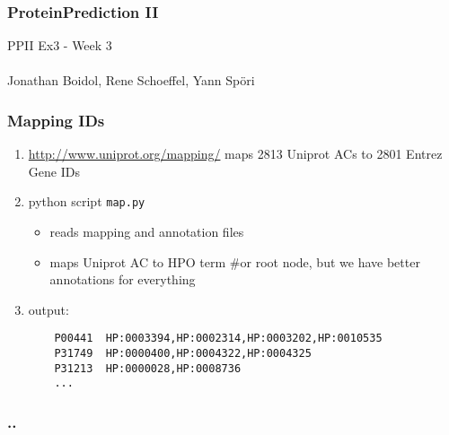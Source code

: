 \documentclass{beamer}
\begin{document}
\begin{frame}
 \frametitle{ProteinPrediction II}
 PPII Ex3 - Week 3\\
 \hfill \\
 Jonathan Boidol, Rene Schoeffel, Yann Sp\"ori
\end{frame}

\begin{frame}[fragile]
 \frametitle{Mapping IDs}
 \begin{enumerate}
 \item \url{http://www.uniprot.org/mapping/} maps 2813 Uniprot ACs to 2801 Entrez Gene IDs
 \item python script \texttt{map.py} 
 	\begin{itemize}
	 \item reads mapping and annotation files
	 \item maps Uniprot AC to HPO term {\color{gray}\#or root node, but we have better annotations for everything}
 	\end{itemize}
 \item output:\\
 \begin{verbatim}
 	P00441  HP:0003394,HP:0002314,HP:0003202,HP:0010535
 	P31749  HP:0000400,HP:0004322,HP:0004325
 	P31213  HP:0000028,HP:0008736
 	...
 \end{verbatim}
\end{enumerate}
\end{frame}

\begin{frame}
 \frametitle{..}
 
\end{frame}
\end{document}
